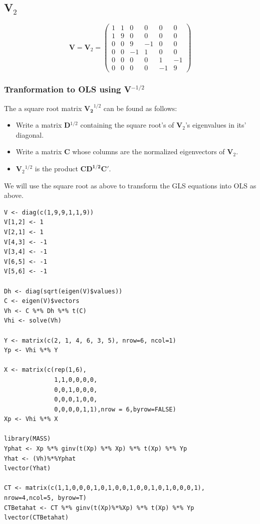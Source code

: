 \documentclass[11pt]{article}
\begin{document}
\subsection{V$_2$}
\label{sec-2-2}

\[ 
\mathbf{V} = \mathbf{V}_2 = 
\begin{pmatrix}
1 & 1 & 0 & 0 & 0 & 0 \\
1 & 9 & 0 & 0 & 0 & 0 \\
0 & 0 & 9 & -1& 0 & 0 \\
0 & 0 & -1& 1 & 0 & 0 \\
0 & 0 & 0 & 0 & 1 & -1 \\
0 & 0 & 0 & 0 & -1 & 9
\end{pmatrix}
\]
\subsubsection{Tranformation to OLS using \textbf{V$^{\mathrm{-1/2}}$}}
\label{sec-2-2-1}


The a square root matrix $\mathbf{V_2}^{1/2}$ can be found as follows:

\begin{itemize}
\item Write a matrix \textbf{D$^{\mathrm{1/2}}$} containing the square root's of \textbf{V$_2$}'s eigenvalues in its' diagonal.
\item Write a matrix \textbf{C} whose columns are the normalized eigenvectors of \textbf{V$_2$}.
\item \textbf{V$_2$$^{\mathrm{1/2}}$} is the product $\mathbf{CD^{1/2}C'}$.
\end{itemize}

We will use the square root as above to transform the GLS equations
into OLS as above.
     

\begin{verbatim}
V <- diag(c(1,9,9,1,1,9))
V[1,2] <- 1
V[2,1] <- 1
V[4,3] <- -1
V[3,4] <- -1
V[6,5] <- -1
V[5,6] <- -1

Dh <- diag(sqrt(eigen(V)$values))
C <- eigen(V)$vectors 
Vh <- C %*% Dh %*% t(C)
Vhi <- solve(Vh)

Y <- matrix(c(2, 1, 4, 6, 3, 5), nrow=6, ncol=1)
Yp <- Vhi %*% Y

X <- matrix(c(rep(1,6),
              1,1,0,0,0,0,
              0,0,1,0,0,0,
              0,0,0,1,0,0,
              0,0,0,0,1,1),nrow = 6,byrow=FALSE)
Xp <- Vhi %*% X

library(MASS)
Yphat <- Xp %*% ginv(t(Xp) %*% Xp) %*% t(Xp) %*% Yp
Yhat <- (Vh)%*%Yphat
lvector(Yhat)

CT <- matrix(c(1,1,0,0,0,1,0,1,0,0,1,0,0,1,0,1,0,0,0,1), nrow=4,ncol=5, byrow=T)
CTBetahat <- CT %*% ginv(t(Xp)%*%Xp) %*% t(Xp) %*% Yp
lvector(CTBetahat)
\end{verbatim}
\end{document}
